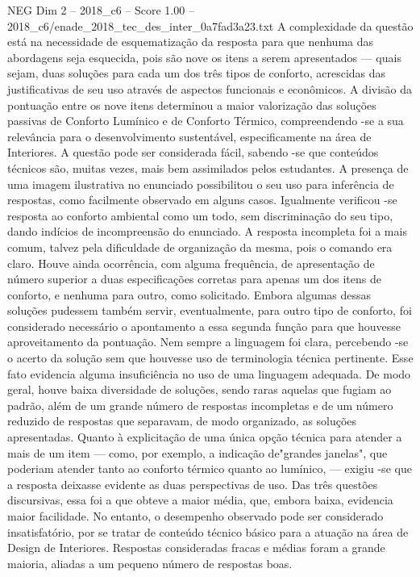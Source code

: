 \begin{textsample}{NEG Dim 2 – 2018\_c6 – Score 1.00 – 2018\_c6/enade\_2018\_tec\_des\_inter\_0a7fad3a23.txt}
A complexidade da questão está na necessidade de esquematização da resposta para que nenhuma das abordagens seja esquecida, pois são nove os itens a serem apresentados — quais sejam, duas soluções para cada um dos três tipos de conforto, acrescidas das justificativas de seu uso através de aspectos funcionais e econômicos.
A divisão da pontuação entre os nove itens determinou a maior valorização das soluções passivas de Conforto Lumínico e de Conforto Térmico, compreendendo -se a sua relevância para o desenvolvimento sustentável, especificamente na área de Interiores.
A questão pode ser considerada fácil, sabendo -se que conteúdos técnicos são, muitas vezes, mais bem assimilados pelos estudantes.
A presença de uma imagem ilustrativa no enunciado possibilitou o seu uso para inferência de respostas, como facilmente observado em alguns casos.
Igualmente verificou -se resposta ao conforto ambiental como um todo, sem discriminação do seu tipo, dando indícios de incompreensão do enunciado.
A resposta incompleta foi a mais comum, talvez pela dificuldade de organização da mesma, pois o comando era claro.
Houve ainda ocorrência, com alguma frequência, de apresentação de número superior a duas especificações corretas para apenas um dos itens de conforto, e nenhuma para outro, como solicitado.
Embora algumas dessas soluções pudessem também servir, eventualmente, para outro tipo de conforto, foi considerado necessário o apontamento a essa segunda função para que houvesse aproveitamento da pontuação.
Nem sempre a linguagem foi clara, percebendo -se o acerto da solução sem que houvesse uso de terminologia técnica pertinente.
Esse fato evidencia alguma insuficiência no uso de uma linguagem adequada.
De modo geral, houve baixa diversidade de soluções, sendo raras aquelas que fugiam ao padrão, além de um grande número de respostas incompletas e de um número reduzido de respostas que separavam, de modo organizado, as soluções apresentadas.
Quanto à explicitação de uma única opção técnica para atender a mais de um item — como, por exemplo, a indicação de"grandes janelas", que poderiam atender tanto ao conforto térmico quanto ao lumínico, — exigiu -se que a resposta deixasse evidente as duas perspectivas de uso.
Das três questões discursivas, essa foi a que obteve a maior média, que, embora baixa, evidencia maior facilidade.
No entanto, o desempenho observado pode ser considerado insatisfatório, por se tratar de conteúdo técnico básico para a atuação na área de Design de Interiores.
Respostas consideradas fracas e médias foram a grande maioria, aliadas a um pequeno número de respostas boas.

\end{textsample}
